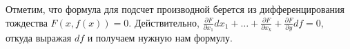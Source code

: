 \documentclass[a4paper]{article}
\theoremstyle{named}
\begin{document}
    \begin{remark*}
        Отметим, что формула для подсчет производной берется из дифференцирования тождества
        $F(x,f(x))=0$. Действительно, $\frac{\partial F}{\partial x_1}dx_1 + \ldots + \frac{\partial F}{\partial x_k}+\frac{\partial F}{\partial y}df=0$, откуда выражая $df$ и получаем нужную нам формулу.
    \end{remark*}
\end{document}

